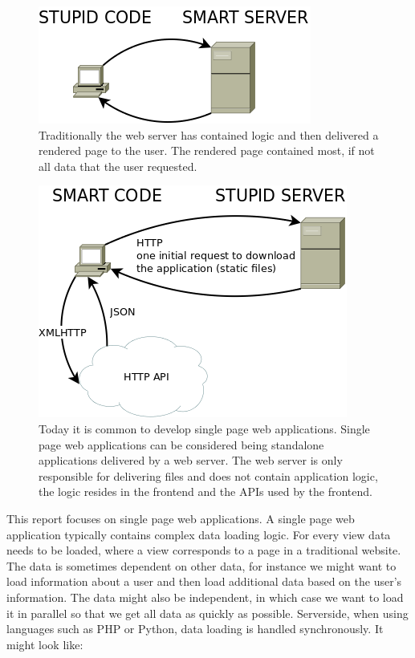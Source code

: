 \documentclass[a4paper,12pt]{article}
\begin{document}
\begin{figure}[!htbp]
  \includegraphics[scale=0.4]{traditional_cs_model.png}
  \caption{
    Traditionally the web server has contained logic and then delivered a rendered page to the user.
    The rendered page contained most, if not all data that the user requested.
  }
\end{figure}

\begin{figure}[!htbp]
  \includegraphics[scale=0.4]{new_cs_model.png}
  \caption{
    Today it is common to develop single page web applications. 
    Single page web applications can be considered being standalone applications delivered by a web server. The web server is only responsible for delivering files
    and does not contain application logic, the logic resides in the frontend and the APIs used by the frontend.
  }
\end{figure}
\clearpage
This report focuses on single page web applications. A single page web application typically contains complex data loading logic. 
For every view data needs to be loaded, where a view corresponds to a page in a traditional website. The data is sometimes dependent on other data, for instance
we might want to load information about a user and then load additional data based on the user's information. The data might also be independent, in which case
we want to load it in parallel so that we get all data as quickly as possible. 
Serverside, when using languages such as PHP or Python, data loading is handled synchronously. It might look like:
\end{document}
